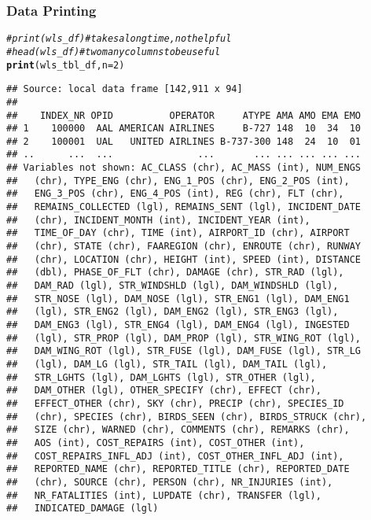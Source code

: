 \documentclass{beamer}\usepackage[]{graphicx}\usepackage[]{color}
\makeatletter
\newcommand{\hlnum}[1]{\textcolor[rgb]{0.686,0.059,0.569}{#1}}%
\newcommand{\hlcom}[1]{\textcolor[rgb]{0.678,0.584,0.686}{\textit{#1}}}%
\newcommand{\hlstd}[1]{\textcolor[rgb]{0.345,0.345,0.345}{#1}}%
\newcommand{\hlkwc}[1]{\textcolor[rgb]{0.333,0.667,0.333}{#1}}%
\newcommand{\hlkwd}[1]{\textcolor[rgb]{0.737,0.353,0.396}{\textbf{#1}}}%
\newenvironment{kframe}{%
 \def\at@end@of@kframe{}%
 \ifinner\ifhmode%
  \def\at@end@of@kframe{\end{minipage}}%
  \begin{minipage}{\columnwidth}%
 \fi\fi%
 \def\FrameCommand##1{\hskip\@totalleftmargin \hskip-\fboxsep
 \colorbox{shadecolor}{##1}\hskip-\fboxsep
     \hskip-\linewidth \hskip-\@totalleftmargin \hskip\columnwidth}%
 \MakeFramed {\advance\hsize-\width
   \@totalleftmargin\z@ \linewidth\hsize
   \@setminipage}}%
 {\par\unskip\endMakeFramed%
 \at@end@of@kframe}
\newenvironment{knitrout}{}{} %
\makeatother
\begin{document}
\begin{frame}[fragile]
  \frametitle{Data Printing}
\begin{knitrout}\footnotesize
{}\color{fgcolor}\begin{kframe}
\begin{alltt}
\hlcom{# print(wls_df)  # takes a long time, not helpful}
\hlcom{# head(wls_df)   # two many columns to be useful}
\hlkwd{print}\hlstd{(wls_tbl_df,} \hlkwc{n} \hlstd{=} \hlnum{2}\hlstd{)}
\end{alltt}
\begin{verbatim}
## Source: local data frame [142,911 x 94]
## 
##    INDEX_NR OPID          OPERATOR     ATYPE AMA AMO EMA EMO
## 1    100000  AAL AMERICAN AIRLINES     B-727 148  10  34  10
## 2    100001  UAL   UNITED AIRLINES B-737-300 148  24  10  01
## ..      ...  ...               ...       ... ... ... ... ...
## Variables not shown: AC_CLASS (chr), AC_MASS (int), NUM_ENGS
##   (chr), TYPE_ENG (chr), ENG_1_POS (chr), ENG_2_POS (int),
##   ENG_3_POS (chr), ENG_4_POS (int), REG (chr), FLT (chr),
##   REMAINS_COLLECTED (lgl), REMAINS_SENT (lgl), INCIDENT_DATE
##   (chr), INCIDENT_MONTH (int), INCIDENT_YEAR (int),
##   TIME_OF_DAY (chr), TIME (int), AIRPORT_ID (chr), AIRPORT
##   (chr), STATE (chr), FAAREGION (chr), ENROUTE (chr), RUNWAY
##   (chr), LOCATION (chr), HEIGHT (int), SPEED (int), DISTANCE
##   (dbl), PHASE_OF_FLT (chr), DAMAGE (chr), STR_RAD (lgl),
##   DAM_RAD (lgl), STR_WINDSHLD (lgl), DAM_WINDSHLD (lgl),
##   STR_NOSE (lgl), DAM_NOSE (lgl), STR_ENG1 (lgl), DAM_ENG1
##   (lgl), STR_ENG2 (lgl), DAM_ENG2 (lgl), STR_ENG3 (lgl),
##   DAM_ENG3 (lgl), STR_ENG4 (lgl), DAM_ENG4 (lgl), INGESTED
##   (lgl), STR_PROP (lgl), DAM_PROP (lgl), STR_WING_ROT (lgl),
##   DAM_WING_ROT (lgl), STR_FUSE (lgl), DAM_FUSE (lgl), STR_LG
##   (lgl), DAM_LG (lgl), STR_TAIL (lgl), DAM_TAIL (lgl),
##   STR_LGHTS (lgl), DAM_LGHTS (lgl), STR_OTHER (lgl),
##   DAM_OTHER (lgl), OTHER_SPECIFY (chr), EFFECT (chr),
##   EFFECT_OTHER (chr), SKY (chr), PRECIP (chr), SPECIES_ID
##   (chr), SPECIES (chr), BIRDS_SEEN (chr), BIRDS_STRUCK (chr),
##   SIZE (chr), WARNED (chr), COMMENTS (chr), REMARKS (chr),
##   AOS (int), COST_REPAIRS (int), COST_OTHER (int),
##   COST_REPAIRS_INFL_ADJ (int), COST_OTHER_INFL_ADJ (int),
##   REPORTED_NAME (chr), REPORTED_TITLE (chr), REPORTED_DATE
##   (chr), SOURCE (chr), PERSON (chr), NR_INJURIES (int),
##   NR_FATALITIES (int), LUPDATE (chr), TRANSFER (lgl),
##   INDICATED_DAMAGE (lgl)
\end{verbatim}
\end{kframe}
\end{knitrout}
\end{frame} 
\end{document}
